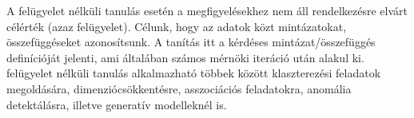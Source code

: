 A felügyelet nélküli tanulás esetén a megfigyelésekhez nem áll rendelkezésre elvárt célérték (azaz felügyelet). Célunk, hogy az adatok közt mintázatokat, összefüggéseket azonosítsunk. A tanítás itt a kérdéses mintázat/összefüggés definícióját jelenti, ami általában számos mérnöki iteráció után alakul ki. felügyelet nélküli tanulás alkalmazható többek között klaszterezési feladatok megoldására, dimenziócsökkentésre, asszociációs feladatokra, anomália detektálásra, illetve generatív modelleknél is.




